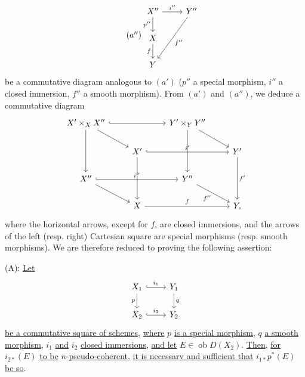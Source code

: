 \begin{equation}\tag{$a''$}
\begin{tikzcd}
X'' \arrow[r,"i''"] \arrow[d,"p''"'] & Y'' \arrow[ddl,"f''"]\\
X \arrow[d,"f"']\\
Y
\end{tikzcd}
\end{equation}
be a commutative diagram analogous to \((a')\) (\(p''\) a special morphism, \(i''\) a closed immersion, \(f''\) a smooth morphism). From \((a')\) and \((a'')\), we deduce a commutative diagram
\[
\begin{tikzcd}
X'\times_X X'' \arrow[rr,hook] \arrow[dr] \arrow[dd] & & Y'\times_Y Y'' \arrow[dr] \arrow[dd] & \\
& X' \arrow[rr,hook,"i'"] \arrow[dd] & & Y' \arrow[dd,"f'"]\\
X'' \arrow[rr,hook,"i''"] \arrow[dr] & & Y'' \arrow[dr,"f''"'] & \\
& X \arrow[rr,"f"] & & Y,
\end{tikzcd}
\]
where the horizontal arrows, except for \(f\), are closed immersions, and the arrows of the left (resp. right) Cartesian square are special morphisms (resp. smooth morphisms). We are therefore reduced to proving the following assertion:

(A): \uline{Let}
\[
\begin{tikzcd}
X_1 \arrow[r,hook,"i_1"] \arrow[d,"p"'] & Y_1 \arrow[d,"q"]\\
X_2 \arrow[r,hook,"i_2"] & Y_2
\end{tikzcd}
\]
\uline{be a commutative square of schemes}, \uline{where} \(p\) \uline{is a special morphism}, \(q\) \uline{a smooth morphism}, \(i_1\) \uline{and} \(i_2\) \uline{closed immersions}, \uline{and let} \(E\in\operatorname{ob} D(X_2)\). \uline{Then}, \uline{for} \(i_{2*}(E)\) \uline{to be} \(n\)-\uline{pseudo-coherent}, \uline{it is necessary and sufficient that} \(i_{1*}p^*(E)\) \uline{be so}.

